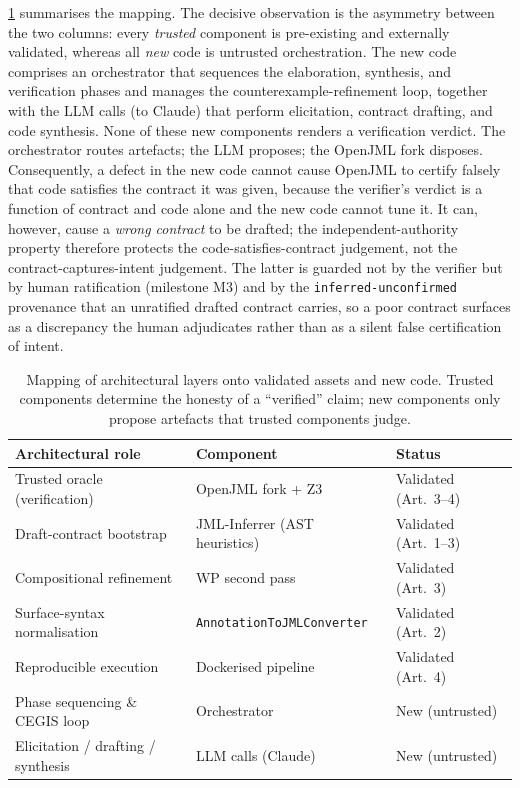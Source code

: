 \cref{tab:inst-components} summarises the mapping. The decisive observation is the asymmetry between the two columns: every \emph{trusted} component is pre-existing and externally validated, whereas all \emph{new} code is untrusted orchestration. The new code comprises an orchestrator that sequences the elaboration, synthesis, and verification phases and manages the counterexample-refinement loop, together with the LLM calls (to Claude) that perform elicitation, contract drafting, and code synthesis. None of these new components renders a verification verdict. The orchestrator routes artefacts; the LLM proposes; the OpenJML fork disposes. Consequently, a defect in the new code cannot cause OpenJML to certify falsely that code satisfies the contract it was given, because the verifier's verdict is a function of contract and code alone and the new code cannot tune it. It can, however, cause a \emph{wrong contract} to be drafted; the independent-authority property therefore protects the code-satisfies-contract judgement, not the contract-captures-intent judgement. The latter is guarded not by the verifier but by human ratification (milestone M3) and by the \texttt{inferred-unconfirmed} provenance that an unratified drafted contract carries, so a poor contract surfaces as a discrepancy the human adjudicates rather than as a silent false certification of intent.

\begin{table}[t]
  \centering
  \caption{Mapping of architectural layers onto validated assets and new code. Trusted components determine the honesty of a ``verified'' claim; new components only propose artefacts that trusted components judge.}
  \label{tab:inst-components}
  \begin{tabular}{@{}lll@{}}
    \toprule
    Architectural role & Component & Status \\
    \midrule
    Trusted oracle (verification) & OpenJML fork + Z3~\cite{cok2014openjml,demoura2008z3} & Validated (Art.~3--4) \\
    Draft-contract bootstrap & JML-Inferrer (AST heuristics)~\cite{edmonds_article3} & Validated (Art.~1--3) \\
    Compositional refinement & WP second pass~\cite{edmonds_article3} & Validated (Art.~3) \\
    Surface-syntax normalisation & \texttt{AnnotationToJMLConverter} & Validated (Art.~2) \\
    Reproducible execution & Dockerised pipeline~\cite{edmonds_article4} & Validated (Art.~4) \\
    \midrule
    Phase sequencing \& CEGIS loop & Orchestrator & New (untrusted) \\
    Elicitation / drafting / synthesis & LLM calls (Claude) & New (untrusted) \\
    \bottomrule
  \end{tabular}
\end{table}

